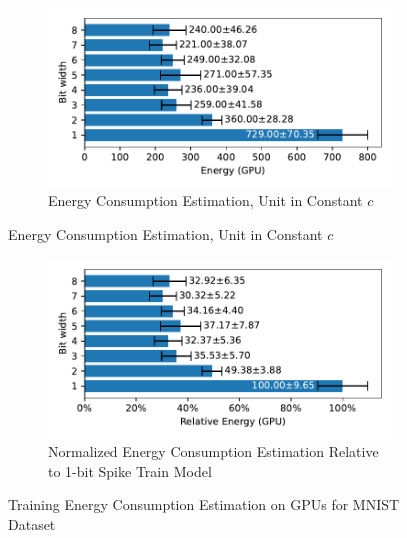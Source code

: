         \begin{figure}[H]
            \centering
            \begin{subfigure}[H]{\textwidth}
                \includegraphics[width=\textwidth]{../standard/MNIST/plots/mnist_train_energy_gpu_horizontal.pdf}
                \caption{Energy Consumption Estimation, Unit in Constant $c$}
            \end{subfigure}
        \end{figure}
        \begin{figure}[H]
            \centering
            \ContinuedFloat
            \begin{subfigure}[H]{\textwidth}
                \includegraphics[width=\textwidth]{../standard/MNIST/plots/mnist_train_relative_energy_gpu_horizontal.pdf}
                \caption{Normalized Energy Consumption Estimation Relative to 1-bit Spike Train Model}
            \end{subfigure}
            \caption{Training Energy Consumption Estimation on GPUs for MNIST Dataset}
        \end{figure}

    \label{appendix:energy_gpu_nmnist}

